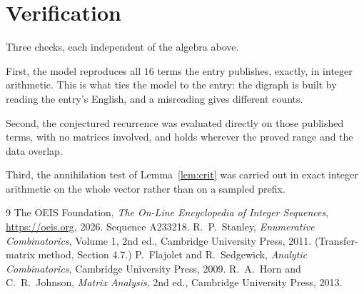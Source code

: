 \documentclass[11pt,a4paper]{article}
\theoremstyle{plain}
\theoremstyle{definition}
\begin{document}
\section{Verification}

Three checks, each independent of the algebra above.

First, the model reproduces all $16$ terms the entry publishes, exactly, in integer
arithmetic. This is what ties the model to the entry: the digraph is built by reading the
entry's English, and a misreading gives different counts.

Second, the conjectured recurrence was evaluated directly on those published terms, with no
matrices involved, and holds wherever the proved range and the data overlap.

Third, the annihilation test of Lemma~\ref{lem:crit} was carried out in exact integer
arithmetic on the whole vector rather than on a sampled prefix.

\begin{thebibliography}{9}
 The OEIS Foundation, \emph{The On-Line Encyclopedia of Integer
Sequences}, \url{https://oeis.org}, 2026. Sequence A233218.
 R.~P.~Stanley, \emph{Enumerative Combinatorics}, Volume 1, 2nd ed.,
Cambridge University Press, 2011. (Transfer-matrix method, Section 4.7.)
 P.~Flajolet and R.~Sedgewick, \emph{Analytic Combinatorics}, Cambridge
University Press, 2009.
 R.~A.~Horn and C.~R.~Johnson, \emph{Matrix Analysis}, 2nd ed., Cambridge
University Press, 2013.
\end{thebibliography}
\end{document}

